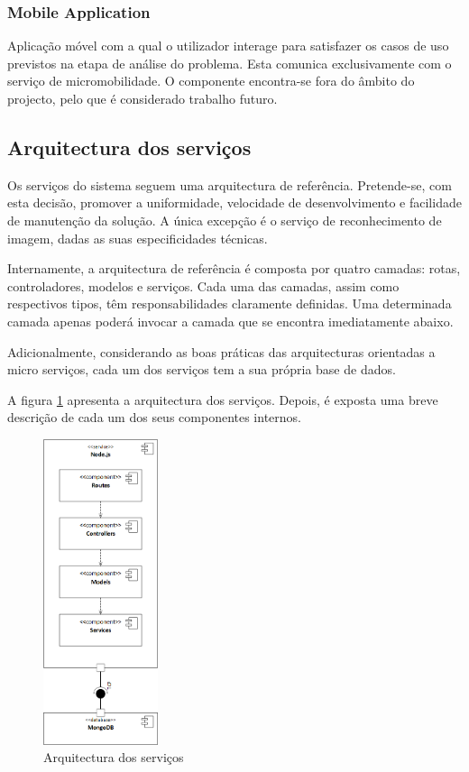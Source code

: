 \subsubsection{Mobile Application}

Aplicação móvel com a qual o utilizador interage para satisfazer os casos de uso previstos na etapa de análise do problema. Esta comunica exclusivamente com o serviço de micromobilidade. O componente encontra-se fora do âmbito do projecto, pelo que é considerado trabalho futuro.

\subsection{Arquitectura dos serviços}

Os serviços do sistema seguem uma arquitectura de referência. Pretende-se, com esta decisão, promover a uniformidade, velocidade de desenvolvimento e facilidade de manutenção da solução. A única excepção é o serviço de reconhecimento de imagem, dadas as suas especificidades técnicas.

Internamente, a arquitectura de referência é composta por quatro camadas: rotas, controladores, modelos  e serviços.  Cada uma das camadas, assim como respectivos tipos, têm responsabilidades claramente definidas. Uma determinada camada apenas poderá invocar a camada que se encontra imediatamente abaixo.

Adicionalmente, considerando as boas práticas das arquitecturas orientadas a micro serviços, cada um dos serviços tem a sua própria base de dados.

A figura \ref{fig:service-arch} apresenta a arquitectura dos serviços. Depois, é exposta uma breve descrição de cada um dos seus componentes internos.

\begin{figure}[H]
    \centering
    \includegraphics[width=0.3\textwidth]{img/service-arch.png}
    \caption{Arquitectura dos serviços}
    \label{fig:service-arch}
\end{figure}

